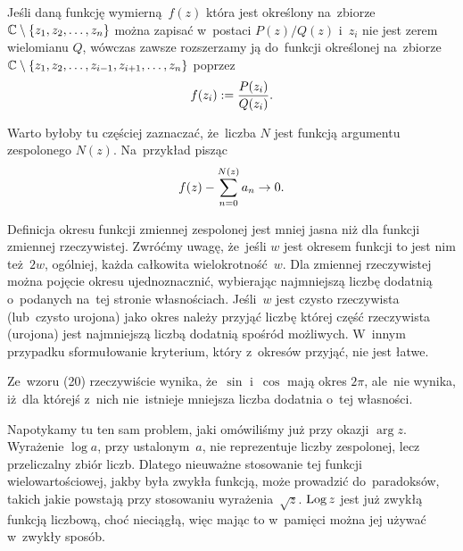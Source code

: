\documentclass[a4paper,11pt]{article}
\begin{document}
Jeśli daną funkcję wymierną~$f( z )$ która jest określony na~zbiorze
$\mathbb{C} \setminus \{  z_{ 1 }, z_{ 2 }, \ldots, z_{ n }  \}$ można zapisać
w~postaci $P( z ) / Q( z )$ i~$z_{ i }$ nie jest zerem wielomianu $Q$,
wówczas zawsze rozszerzamy ją do~funkcji określonej na~zbiorze
$\mathbb{C} \setminus \{  z_{ 1 }, z_{ 2 }, \ldots, z_{ i - 1 }, z_{ i + 1 },
  \ldots, z_{ n }  \}$ poprzez
\begin{equation}
  \label{eq:Leja-34}
  \begin{split}
    f( z_{ i } ) := \frac{ P( z_{ i } ) }{ Q( z_{ i } ) }.
  \end{split}
\end{equation}

\vspace{\spaceFour}


\start {} Warto byłoby tu częściej zaznaczać, że~liczba $N$ jest
funkcją argumentu zespolonego $N( z )$. Na~przykład pisząc
\begin{equation}
  \label{eq:Leja-35}
  \begin{split}
    f( z ) - \sum\limits_{ n = 0 }^{ N( z ) } a_{ n } \to 0.
  \end{split}
\end{equation}

\vspace{\spaceFour}


\start {} Definicja okresu funkcji zmiennej zespolonej jest
mniej jasna niż dla funkcji zmiennej rzeczywistej. Zwróćmy uwagę,
że~jeśli $w$ jest okresem funkcji to jest nim też~$2w$, ogólniej,
każda całkowita wielokrotność~$w$. Dla zmiennej rzeczywistej można
pojęcie okresu ujednoznacznić, wybierając najmniejszą liczbę dodatnią
o~podanych na~tej stronie własnościach. Jeśli~$w$ jest czysto
rzeczywista (lub~czysto urojona) jako okres należy przyjąć liczbę
której część rzeczywista (urojona) jest najmniejszą liczbą dodatnią
spośród możliwych. W~innym przypadku sformułowanie kryterium, który
z~okresów przyjąć, nie jest łatwe.

\vspace{\spaceFour}


\start {} Ze~wzoru (20) rzeczywiście wynika, że~$\sin$ i~$\cos$
mają okres $2\pi$, ale~nie wynika, iż~dla którejś z~nich nie~istnieje
mniejsza liczba dodatnia o~tej własności.

\vspace{\spaceFour}


\start {} Napotykamy tu ten sam problem, jaki omówiliśmy już
przy okazji $\arg z$. Wyrażenie $\log a$, przy ustalonym~$a$, nie
reprezentuje liczby zespolonej, lecz przeliczalny zbiór liczb. Dlatego
nieuważne stosowanie tej funkcji wielowartościowej, jakby była zwykła
funkcją, może prowadzić do~paradoksów, takich jakie powstają przy
stosowaniu wyrażenia~$\sqrt{ z }$. $\textrm{Log}\, z$ jest już zwykłą
funkcją liczbową, choć nieciągłą, więc mając to w~pamięci można jej
używać w~zwykły sposób.
\end{document}
